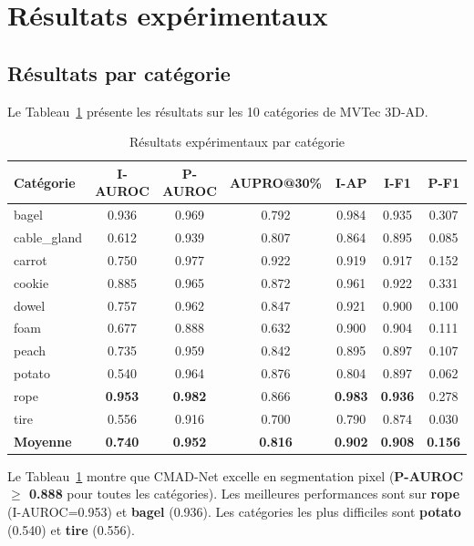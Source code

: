 \documentclass[12pt,a4paper,oneside]{report}
\begin{document}
\section{Résultats expérimentaux}

\subsection{Résultats par catégorie}

Le Tableau~\ref{tab:resultats} présente les résultats sur les 10 catégories de MVTec 3D-AD.

\begin{table}[H]
\centering
\caption{Résultats expérimentaux par catégorie}
\label{tab:resultats}
\small
\begin{tabularx}{\textwidth}{X c c c c c c}
\toprule
\textbf{Catégorie} & \textbf{I-AUROC} & \textbf{P-AUROC} & \textbf{AUPRO@30\%} & \textbf{I-AP} & \textbf{I-F1} & \textbf{P-F1} \\
\midrule
\rowcolor{tableheader} bagel & 0.936 & 0.969 & 0.792 & 0.984 & 0.935 & 0.307 \\
cable\_gland & 0.612 & 0.939 & 0.807 & 0.864 & 0.895 & 0.085 \\
\rowcolor{tableheader} carrot & 0.750 & 0.977 & 0.922 & 0.919 & 0.917 & 0.152 \\
cookie & 0.885 & 0.965 & 0.872 & 0.961 & 0.922 & 0.331 \\
\rowcolor{tableheader} dowel & 0.757 & 0.962 & 0.847 & 0.921 & 0.900 & 0.100 \\
foam & 0.677 & 0.888 & 0.632 & 0.900 & 0.904 & 0.111 \\
\rowcolor{tableheader} peach & 0.735 & 0.959 & 0.842 & 0.895 & 0.897 & 0.107 \\
potato & 0.540 & 0.964 & 0.876 & 0.804 & 0.897 & 0.062 \\
\rowcolor{tableheader} rope & \textbf{0.953} & \textbf{0.982} & 0.866 & \textbf{0.983} & \textbf{0.936} & 0.278 \\
tire & 0.556 & 0.916 & 0.700 & 0.790 & 0.874 & 0.030 \\
\midrule
\textbf{Moyenne} & \textbf{0.740} & \textbf{0.952} & \textbf{0.816} & \textbf{0.902} & \textbf{0.908} & \textbf{0.156} \\
\bottomrule
\end{tabularx}
\end{table}

Le Tableau~\ref{tab:resultats} montre que CMAD-Net excelle en segmentation pixel (\textbf{P-AUROC $\geq$ 0.888} pour toutes les catégories). Les meilleures performances sont sur \textbf{rope} (I-AUROC=0.953) et \textbf{bagel} (0.936). Les catégories les plus difficiles sont \textbf{potato} (0.540) et \textbf{tire} (0.556).
\end{document}
